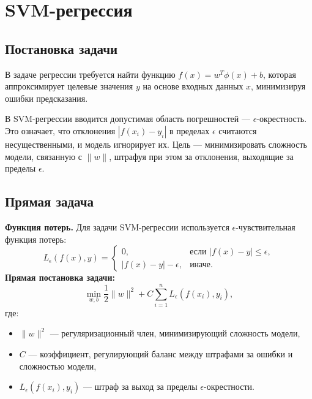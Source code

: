 \section{SVM-регрессия}
\subsection{Постановка задачи}
\par В задаче регрессии требуется найти функцию \( f(x) = w^T \phi(x) + b \), которая аппроксимирует целевые значения \( y \) на основе входных данных \( x \), минимизируя ошибки предсказания.
\par В SVM-регрессии вводится допустимая область погрешностей — \(\epsilon\)-окрестность. Это означает, что отклонения \( |f(x_i) - y_i| \) в пределах \(\epsilon\) считаются несущественными, и модель игнорирует их. Цель — минимизировать сложность модели, связанную с \(\|w\|\), штрафуя при этом за отклонения, выходящие за пределы \(\epsilon\).

\subsection{Прямая задача}
\par\textbf{Функция потерь.}  
Для задачи SVM-регрессии используется \(\epsilon\)-чувствительная функция потерь:
\begin{equation*}
    L_\epsilon(f(x), y) = 
    \begin{cases} 
        0, & \text{если } |f(x) - y| \leq \epsilon, \\ 
        |f(x) - y| - \epsilon, & \text{иначе.}
    \end{cases}
\end{equation*}
\noindent\textbf{Прямая постановка задачи:}
\begin{equation*}
    \min_{w, b} \frac{1}{2} \|w\|^2 + C \sum_{i=1}^n L_\epsilon(f(x_i), y_i),
\end{equation*}
где:
\begin{itemize}
    \item \(\|w\|^2\) — регуляризационный член, минимизирующий сложность модели,
    \item \(C\) — коэффициент, регулирующий баланс между штрафами за ошибки и сложностью модели,
    \item \(L_\epsilon(f(x_i), y_i)\) — штраф за выход за пределы \(\epsilon\)-окрестности.
\end{itemize}

